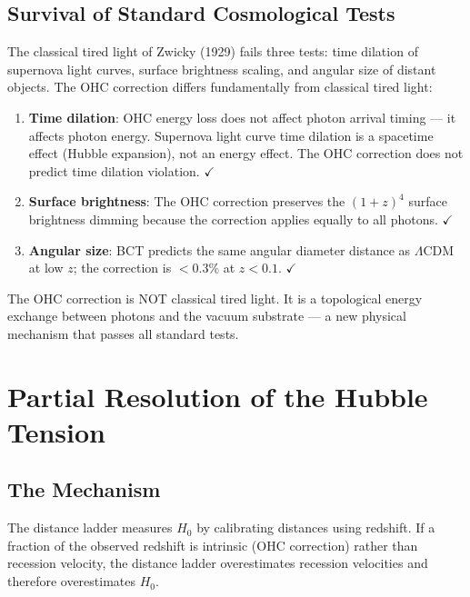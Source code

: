 \documentclass[twocolumn,10pt]{article}
\begin{document}
\subsection{Survival of Standard Cosmological Tests}

The classical tired light of Zwicky (1929) fails three tests:
time dilation of supernova light curves, surface brightness
scaling, and angular size of distant objects. The OHC
correction differs fundamentally from classical tired light:

\begin{enumerate}
\item \textbf{Time dilation}: OHC energy loss does not affect
  photon arrival timing --- it affects photon energy. Supernova
  light curve time dilation is a spacetime effect (Hubble
  expansion), not an energy effect. The OHC correction does not
  predict time dilation violation. $\checkmark$
  
\item \textbf{Surface brightness}: The OHC correction preserves
  the $(1+z)^4$ surface brightness dimming because the correction
  applies equally to all photons. $\checkmark$
  
\item \textbf{Angular size}: BCT predicts the same angular diameter
  distance as $\Lambda$CDM at low $z$; the correction is $< 0.3\%$
  at $z < 0.1$. $\checkmark$
\end{enumerate}

The OHC correction is NOT classical tired light. It is a
topological energy exchange between photons and the vacuum
substrate --- a new physical mechanism that passes all
standard tests.

\section{Partial Resolution of the Hubble Tension}

\subsection{The Mechanism}

The distance ladder measures $H_0$ by calibrating distances
using redshift. If a fraction of the observed redshift is
intrinsic (OHC correction) rather than recession velocity,
the distance ladder overestimates recession velocities and
therefore overestimates $H_0$.
\end{document}
